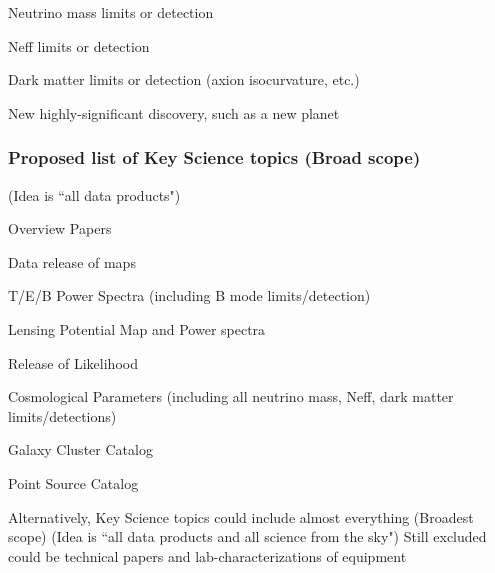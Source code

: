 Neutrino mass limits or detection

Neff limits or detection

Dark matter limits or detection (axion isocurvature, etc.)

New highly-significant discovery, such as a new planet

\subsubsection{Proposed list of Key Science topics (Broad scope)}

(Idea is ``all data products")

Overview Papers

Data release of maps

T/E/B Power Spectra (including B mode limits/detection)

Lensing Potential Map and Power spectra

Release of Likelihood

Cosmological Parameters (including all neutrino mass, Neff, dark matter limits/detections)

Galaxy Cluster Catalog

Point Source Catalog

Alternatively, Key Science topics could include almost everything (Broadest scope)
(Idea is ``all data products and all science from the sky")
Still excluded could be technical papers and lab-characterizations of equipment






